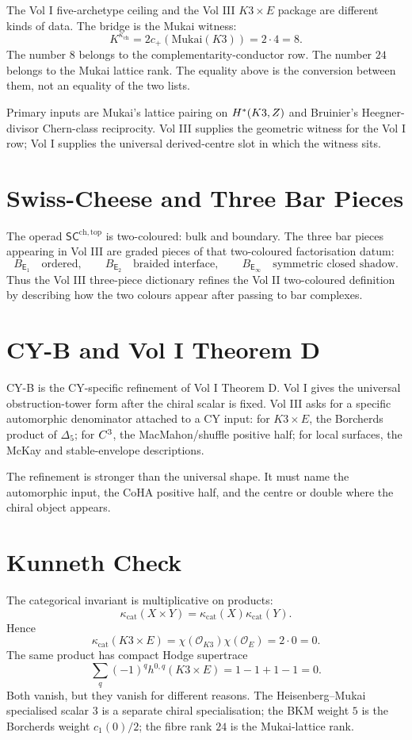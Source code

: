 \documentclass[11pt]{article}
\providecommand{\Eone}{\mathsf{E}_1}
\providecommand{\Etwo}{\mathsf{E}_2}
\providecommand{\Einf}{\mathsf{E}_\infty}
\providecommand{\cO}{\mathcal{O}}
\providecommand{\SCchtop}{\mathsf{SC}^{\mathrm{ch,top}}}
\providecommand{\kcat}{\kappa_{\mathrm{cat}}}
\providecommand{\KD}{K^{\kappa_{\mathrm{ch}}}}
\begin{document}
The Vol I five-archetype ceiling and the Vol III $K3\times E$ package
are different kinds of data. The bridge is the Mukai witness:
\[
 \KD=2c_+(\mathrm{Mukai}(K3))=2\cdot 4=8.
\]
The number $8$ belongs to the complementarity-conductor row. The number
$24$ belongs to the Mukai lattice rank. The equality above is the
conversion between them, not an equality of the two lists.

Primary inputs are Mukai's lattice pairing on $H^\ast(K3,Z)$ and
Bruinier's Heegner-divisor Chern-class reciprocity. Vol III supplies the
geometric witness for the Vol I row; Vol I supplies the universal
derived-centre slot in which the witness sits.

\section{Swiss-Cheese and Three Bar Pieces}
\label{sec:swiss}

The operad $\SCchtop$ is two-coloured: bulk and boundary. The three bar
pieces appearing in Vol III are graded pieces of that two-coloured
factorisation datum:
\[
 B_{\Eone}\quad\text{ordered},\qquad
 B_{\Etwo}\quad\text{braided interface},\qquad
 B_{\Einf}\quad\text{symmetric closed shadow}.
\]
Thus the Vol III three-piece dictionary refines the Vol II two-coloured
definition by describing how the two colours appear after passing to bar
complexes.

\section{CY-B and Vol I Theorem D}
\label{sec:cyb}

CY-B is the CY-specific refinement of Vol I Theorem D. Vol I gives the
universal obstruction-tower form after the chiral scalar is fixed. Vol
III asks for a specific automorphic denominator attached to a CY input:
for $K3\times E$, the Borcherds product of $\Delta_5$; for $C^3$, the
MacMahon/shuffle positive half; for local surfaces, the McKay and
stable-envelope descriptions.

The refinement is stronger than the universal shape. It must name the
automorphic input, the CoHA positive half, and the centre or double
where the chiral object appears.

\section{Kunneth Check}
\label{sec:kunneth}

The categorical invariant is multiplicative on products:
\[
 \kcat(X\times Y)=\kcat(X)\kcat(Y).
\]
Hence
\[
 \kcat(K3\times E)=\chi(\cO_{K3})\chi(\cO_E)=2\cdot 0=0.
\]
The same product has compact Hodge supertrace
\[
 \sum_q(-1)^q h^{0,q}(K3\times E)=1-1+1-1=0.
\]
Both vanish, but they vanish for different reasons. The
Heisenberg--Mukai specialised scalar $3$ is a separate chiral
specialisation; the BKM weight $5$ is the Borcherds weight
$c_1(0)/2$; the fibre rank $24$ is the Mukai-lattice rank.
\end{document}
